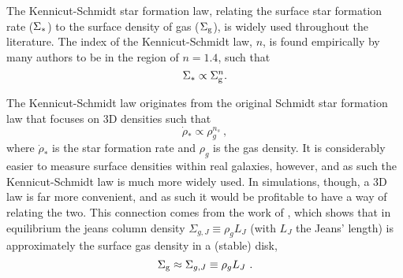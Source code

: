 The Kennicut-Schmidt star formation law, relating the surface star formation rate ($\Sigma_*$) to the surface density of gas ($\Sigma_\mathrm{g}$), is widely used throughout the literature.
The index of the Kennicut-Schmidt law, $n$, is found empirically by many authors \citep{kennicutt_star_1989, kennicutt_jr._star_2007, bigiel_star_2008} to be in the region of $n=1.4$, such that
\begin{equation}
\label{eqn:ks}
\Sigma_* \propto \Sigma_\mathrm{g}^n.
\end{equation}

The Kennicut-Schmidt law originates from the original Schmidt star formation law  \cite{schmidt_rate_1959} that focuses on 3D densities such that
\begin{equation}
\label{eqn:s}
\dot{\rho}_* \propto \rho_g^{n_s}~,
\end{equation}
where $\dot{\rho}_*$ is the star formation rate and $\rho_g$ is the gas density.
It is considerably easier to measure surface densities within real galaxies, however, and as such the Kennicut-Schmidt law is much more widely used.
In simulations, though, a 3D law is far more convenient, and as such it would be profitable to have a way of relating the two. 
This connection comes from the work of \citet{schaye_model-independent_2001}, which shows that in equilibrium the jeans column density $\Sigma_{g, J} \equiv \rho_g L_J$ (with $L_J$ the Jeans' length) is approximately the surface gas density in a (stable) disk,
\begin{equation}
\label{eqn:s04}
\Sigma_\mathrm{g} \approx \Sigma_{g, J} \equiv \rho_g L_J~.
\end{equation}
